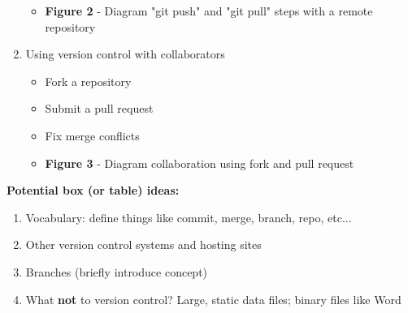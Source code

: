 \begin{enumerate}
\begin{itemize}
    \item \textbf{Figure 2} - Diagram "git push" and "git pull" steps with a remote repository
  \end{itemize}
  \item Using version control with collaborators
    \begin{itemize}
      \item Fork a repository
      \item Submit a pull request
      \item Fix merge conflicts
      \item \textbf{Figure 3} - Diagram collaboration using fork and pull request
  \end{itemize}
\end{enumerate}



\textbf{Potential box (or table) ideas:}
\begin{enumerate}
  \item Vocabulary: define things like commit, merge, branch, repo, etc...
  \item Other version control systems and hosting sites
  \item Branches (briefly introduce concept)
  \item What \textbf{not} to version control? Large, static data files; binary files like Word
\end{enumerate}